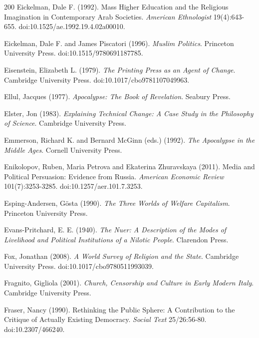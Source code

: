 \documentclass[11pt,letterpaper]{article}
\theoremstyle{definition}
\theoremstyle{remark}
\begin{document}
\begin{thebibliography}{200}
Eickelman, Dale F. (1992). Mass Higher Education and the Religious Imagination in Contemporary Arab Societies. \emph{American Ethnologist} 19(4):643-655. doi:10.1525/ae.1992.19.4.02a00010.

Eickelman, Dale F. and James Piscatori (1996). \emph{Muslim Politics}. Princeton University Press. doi:10.1515/9780691187785.

Eisenstein, Elizabeth L. (1979). \emph{The Printing Press as an Agent of Change}. Cambridge University Press. doi:10.1017/cbo9781107049963.

Ellul, Jacques (1977). \emph{Apocalypse: The Book of Revelation}. Seabury Press.

Elster, Jon (1983). \emph{Explaining Technical Change: A Case Study in the Philosophy of Science}. Cambridge University Press.

Emmerson, Richard K. and Bernard McGinn (eds.) (1992). \emph{The Apocalypse in the Middle Ages}. Cornell University Press.

Enikolopov, Ruben, Maria Petrova and Ekaterina Zhuravskaya (2011). Media and Political Persuasion: Evidence from Russia. \emph{American Economic Review} 101(7):3253-3285. doi:10.1257/aer.101.7.3253.

Esping-Andersen, G\"osta (1990). \emph{The Three Worlds of Welfare Capitalism}. Princeton University Press.

Evans-Pritchard, E. E. (1940). \emph{The Nuer: A Description of the Modes of Livelihood and Political Institutions of a Nilotic People}. Clarendon Press.

Fox, Jonathan (2008). \emph{A World Survey of Religion and the State}. Cambridge University Press. doi:10.1017/cbo9780511993039.

Fragnito, Gigliola (2001). \emph{Church, Censorship and Culture in Early Modern Italy}. Cambridge University Press.

Fraser, Nancy (1990). Rethinking the Public Sphere: A Contribution to the Critique of Actually Existing Democracy. \emph{Social Text} 25/26:56-80. doi:10.2307/466240.


\end{thebibliography}
\end{document}
